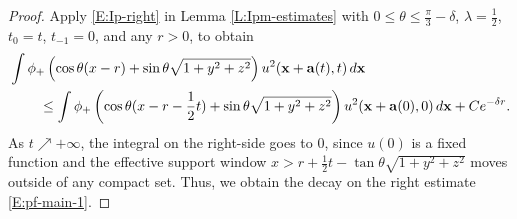 \documentclass[12pt,letterpaper]{amsart}
\newcommand{\indentalign}{\hspace{0.3in}&\hspace{-0.3in}}
\theoremstyle{remark}
\numberwithin{equation}{section}
\numberwithin{theorem}{section}
\numberwithin{table}{section}
\begin{document}
\begin{proof}
Apply \eqref{E:Ip-right} in Lemma \ref{L:Ipm-estimates} with $0\leq \theta\leq \frac{\pi}{3}-\delta$, $\lambda = \frac12$, $t_0=t$, $t_{-1}=0$, and any $r>0$, to obtain
\begin{align*}
\indentalign \int \phi_+\left(\cos\theta(x-r)+\sin\theta \sqrt{1+y^2+z^2}\right)u^2(\mathbf{x}+\mathbf{a}(t),t) \, d\mathbf{x} \\
&\leq \int \phi_+\left(\cos\theta(x-r-\frac12t)+\sin\theta \sqrt{1+y^2+z^2}\right) u^2(\mathbf{x}+\mathbf{a}(0),0) \,d \mathbf{x} + Ce^{-\delta r}.
\end{align*}
As $t \nearrow +\infty$, the integral on the right-side goes to $0$, since $u(0)$ is a fixed function and the effective support window $x>r+\frac12 t - \tan\theta \sqrt{1+y^2+z^2}$ moves outside of any compact set.  Thus, we obtain the decay on the right estimate \eqref{E:pf-main-1}.


\end{proof}
\end{document}
